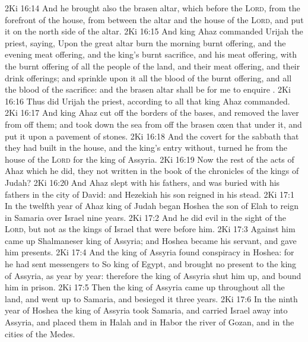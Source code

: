 \vs 2Ki 16:14 And he brought also the brasen altar, which  before the \textsc{Lord}, from the forefront of the house, from between the altar and the house of the \textsc{Lord}, and put it on the north side of the altar.
\vs 2Ki 16:15 And king Ahaz commanded Urijah the priest, saying, Upon the great altar burn the morning burnt offering, and the evening meat offering, and the king's burnt sacrifice, and his meat offering, with the burnt offering of all the people of the land, and their meat offering, and their drink offerings; and sprinkle upon it all the blood of the burnt offering, and all the blood of the sacrifice: and the brasen altar shall be for me to enquire .
\vs 2Ki 16:16 Thus did Urijah the priest, according to all that king Ahaz commanded.
\vs 2Ki 16:17 And king Ahaz cut off the borders of the bases, and removed the laver from off them; and took down the sea from off the brasen oxen that  under it, and put it upon a pavement of stones.
\vs 2Ki 16:18 And the covert for the sabbath that they had built in the house, and the king's entry without, turned he from the house of the \textsc{Lord} for the king of Assyria.
\vs 2Ki 16:19 Now the rest of the acts of Ahaz which he did,  they not written in the book of the chronicles of the kings of Judah?
\vs 2Ki 16:20 And Ahaz slept with his fathers, and was buried with his fathers in the city of David: and Hezekiah his son reigned in his stead.
\vs 2Ki 17:1 In the twelfth year of Ahaz king of Judah began Hoshea the son of Elah to reign in Samaria over Israel nine years.
\vs 2Ki 17:2 And he did  evil in the sight of the \textsc{Lord}, but not as the kings of Israel that were before him.
\vs 2Ki 17:3 Against him came up Shalmaneser king of Assyria; and Hoshea became his servant, and gave him presents.
\vs 2Ki 17:4 And the king of Assyria found conspiracy in Hoshea: for he had sent messengers to So king of Egypt, and brought no present to the king of Assyria, as  year by year: therefore the king of Assyria shut him up, and bound him in prison.
\vs 2Ki 17:5 Then the king of Assyria came up throughout all the land, and went up to Samaria, and besieged it three years.
\vs 2Ki 17:6 In the ninth year of Hoshea the king of Assyria took Samaria, and carried Israel away into Assyria, and placed them in Halah and in Habor  the river of Gozan, and in the cities of the Medes.
